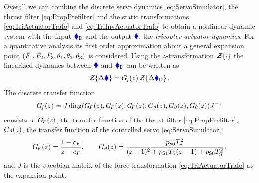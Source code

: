 Overall we can combine the discrete servo dynamics \eqref{eq:ServoSimulator}, the thrust filter \eqref{eq:PropPrefilter} and the static transformations \eqref{eq:TriActuatorTrafo} and \eqref{eq:TriInvActuatorTrafo} to obtain a nonlinear dynamic system with the input $\genForceD$ and the output $\genForce$, the \textit{tricopter actuator dynamics}.
For a quantitative analysis its first order approximation about a general expansion point $(\PropForceStat[1], \PropForceStat[2], \PropForceStat[3], \aServoStat[1], \aServoStat[2], \aServoStat[3])$ is considered.
Using the $z$-transformation $\ZTrafo{\cdot}$ the linearized dynamics between $\genForce$ and $\genForceD$ can be written as 
\begin{align}
 \ZTrafo{\Delta \genForce} = \GenForceTransferFunction(z) \, \ZTrafo{\Delta \genForceD}.
\end{align}
The discrete transfer function
\begin{align}\label{eq:TriActuatorTransferFunction}
 \GenForceTransferFunction(z) = J \diag(\ThrustTransferFunction(z), \ThrustTransferFunction(z), \ThrustTransferFunction(z), \ServoTransferFunction(z), \ServoTransferFunction(z), \ServoTransferFunction(z)) J^{-1}
\end{align}
consists of $\ThrustTransferFunction(z)$, the transfer function of the thrust filter \eqref{eq:PropPrefilter}, $\ServoTransferFunction(z)$, the transfer function of the controlled servo \eqref{eq:ServoSimulator}:
\begin{align}
 \ThrustTransferFunction(z) = \frac{1-c_F}{z-c_F},
\qquad
 \ServoTransferFunction(z) = \frac{\ServoParam[0] \Ts^2}{(z-1)^2 + \ServoParam[1]\Ts (z-1) + \ServoParam[0] \Ts^2}
 .
\end{align}
and $J$ is the Jacobian matrix of the force transformation \eqref{eq:TriActuatorTrafo} at the expansion point.
